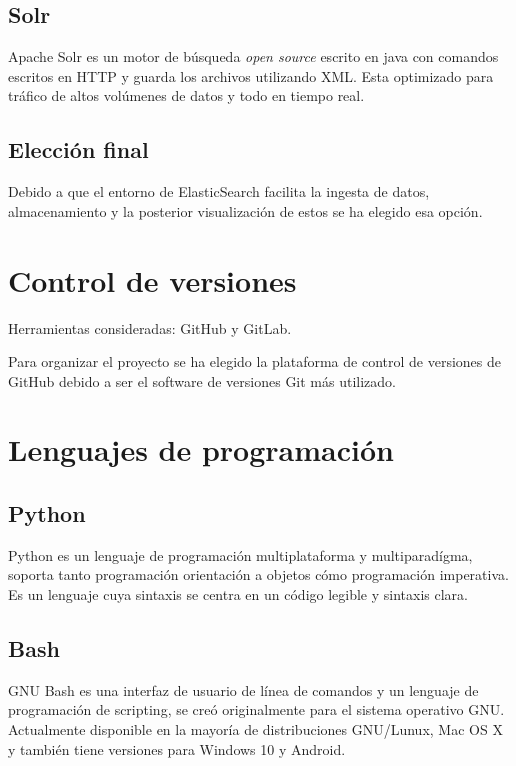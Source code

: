 \subsection{Solr}
Apache Solr es un motor de búsqueda \textit{open source} escrito en java con comandos escritos en HTTP y guarda los archivos utilizando XML. Esta optimizado para tráfico de altos volúmenes de datos y todo en tiempo real.\cite{pagina:Solr} 

\subsection{Elección final}

Debido a que el entorno de ElasticSearch facilita la ingesta de datos, almacenamiento y la posterior visualización de estos se ha elegido esa opción.

\section{Control de versiones}

Herramientas consideradas: GitHub y GitLab.

Para organizar el proyecto se ha elegido la plataforma de control de versiones de GitHub debido a ser el software de versiones Git más utilizado.

\section{Lenguajes de programación}

\subsection{Python}
Python es un lenguaje de programación multiplataforma y multiparadígma, soporta tanto programación orientación a objetos cómo programación imperativa. Es un lenguaje cuya sintaxis se centra en un código legible y sintaxis clara. \cite{pagina:Python_documentation}

\subsection{Bash}
GNU Bash es una interfaz de usuario de línea de comandos y un lenguaje de programación de scripting, se creó originalmente para el sistema operativo GNU. Actualmente disponible en la mayoría de distribuciones GNU/Lunux, Mac OS X y también tiene versiones para Windows 10 y Android.

